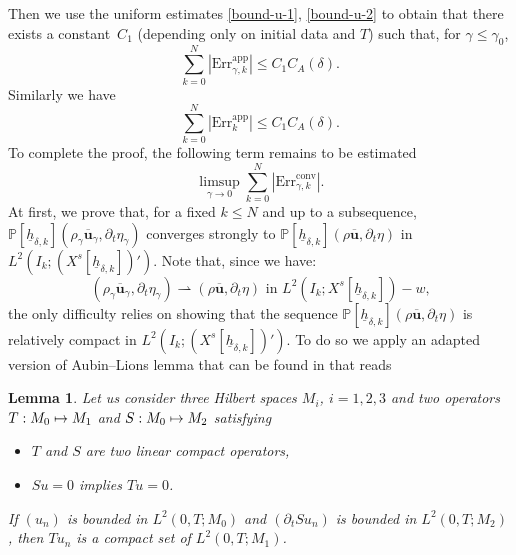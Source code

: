 \documentclass[10pt]{amsart}
\newcommand\mto{\mathchoice{\longmapsto}{\mapsto}{\mapsto}{\mapsto}}
\newcommand{\app}{\mathrm{app}}
\newcommand{\conv}{\mathrm{conv}}
\newcommand{\Err}{\mathrm{Err}}
\newtheorem{lemma}[theorem]{Lemma}
\theoremstyle{remark}
\theoremstyle{definition}
\newcommand{\ug}{\boldsymbol{u}}
\newcommand{\hb}{{\underline{h}}}
\begin{document}
Then we use the uniform estimates \eqref{bound-u-1}, \eqref{bound-u-2} to obtain that there exists a constant~$C_1$
(depending only on initial data and $T$) such that, for $\gamma \leq \gamma_0$,
\begin{equation} \label{eq_Err1}
\sum_{k=0}^N |\Err_{\gamma,k}^{\app}| \leq C_1 C_A(\delta).
\end{equation}
Similarly we have
\begin{equation} \label{eq_Err2}
\sum_{k=0}^N |\Err_{k}^{\app}| \leq C_1 C_A(\delta).
\end{equation}
To complete the proof, the following term remains to be estimated
\[
\limsup_{\gamma \to 0} \sum_{k=0}^N |\Err_{\gamma,k}^{\conv}|.
\]
At first, we prove that, for a fixed $k \leq N$ and up to a subsequence, $\mathbb{P}[\hb_{\delta, k}](\rho_{\gamma}\overline{\ug}_{\gamma},\partial_{t}\eta_{\gamma})$ converges strongly to $\mathbb{P}[\hb_{\delta, k}](\rho\overline{\ug},\partial_{t}\eta)$ in $L^{2}(I_{k};(X^{s}[\hb_{\delta, k}])')$. Note that, since we have:
\[
(\rho_{\gamma}\overline{\ug}_{\gamma},\partial_t \eta_{\gamma}) \rightharpoonup (\rho \overline{\ug},\partial_t \eta) \text{ in $L^2(I_k;X^s[\hb_{\delta, k}])-w$,}
\]
the only difficulty relies on showing that the sequence $\mathbb{P}[\hb_{\delta, k}](\rho\overline{\ug},\partial_{t}\eta)$ is relatively compact in $L^{2}(I_{k};(X^{s}[\hb_{\delta, k}])')$.
To do so we apply an adapted version of Aubin--Lions lemma that can be found in \cite[\S 4.3]{Fujita-Sauer} that reads
\begin{lemma} Let us consider three Hilbert spaces $M_i$, $i=1, 2,3 $ and two operators $T : M_0 \mto M_1$ and $S : M_0 \mto M_2$ satisfying
\begin{itemize}
\item $T$ and $S$ are two linear compact operators,
\item $Su=0$ implies $Tu=0$.
\end{itemize}
If $(u_n)$ is bounded in $L^2(0, T; M_0)$ and $(\partial_t S u_n)$ is bounded in $L^2(0, T; M_2)$, then $T u_n$ is a compact set of $L^2(0, T; M_1)$.
\end{lemma}
\end{document}
